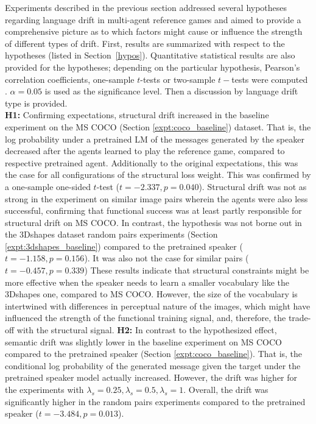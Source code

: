 Experiments described in the previous section addressed several hypotheses regarding language drift in multi-agent reference games and aimed to provide a comprehensive picture as to which factors might cause or influence the strength of different types of drift.
First, results are summarized with respect to the hypotheses (listed in Section~\ref{hypos}). Quantitative statistical results are also provided for the hypotheses; depending on the particular hypothesis, Pearson's correlation coefficients, one-sample $t$-tests or two-sample $t-$tests were computed . $\alpha=0.05$ is used as the significance level. 
Then a discussion by language drift type is provided.  \\
\newline
\textbf{H1:} Confirming expectations, structural drift increased in the baseline experiment on the MS COCO (Section \ref{expt:coco_baseline}) dataset. That is, the log probability under a pretrained LM of the messages generated by the speaker decreased after the agents learned to play the reference game, compared to respective pretrained agent. Additionally to the original expectations, this was the case for all configurations of the structural loss weight. This was confirmed by a one-sample one-sided $t$-test ($t = -2.337, p = 0.040$). Structural drift was not as strong in the experiment on similar image pairs wherein the agents were also less successful, confirming that functional success was at least partly responsible for structural drift on MS COCO.
In contrast, the hypothesis was not borne out in the 3Dshapes dataset random pairs experiments (Section \ref{expt:3dshapes_baseline}) compared to the pretrained speaker ($t = -1.158, p = 0.156$). It was also not the case for similar pairs ($t = -0.457, p = 0.339$)
These results indicate that structural constraints might be more effective when the speaker needs to learn a smaller vocabulary like the 3Dshapes one, compared to MS COCO. However, the size of the vocabulary is intertwined with differences in perceptual nature of the images, which might have influenced the strength of the functional training signal, and, therefore, the trade-off with the structural signal.\newline
\textbf{H2:} In contrast to the hypothesized effect, semantic drift was slightly lower in the baseline experiment on MS COCO compared to the pretrained speaker (Section \ref{expt:coco_baseline}). That is, the conditional log probability of the generated message given the target under the pretrained speaker model actually increased. However, the drift was higher for the experiments with $\lambda_s=0.25, \lambda_s=0.5, \lambda_s=1$. Overall, the drift was significantly higher in the random pairs experiments compared to the pretrained speaker ($t = -3.484, p = 0.013$).
